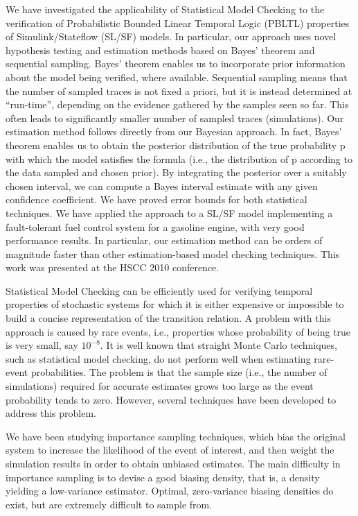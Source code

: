 We have investigated the applicability of Statistical Model Checking to the verification of Probabilistic Bounded Linear Temporal Logic (PBLTL) properties of Simulink/Stateflow (SL/SF) models. In particular, our approach uses novel hypothesis testing and estimation methods based on Bayes’ theorem and sequential sampling. Bayes’ theorem enables us to incorporate prior information about the model being verified, where available. Sequential sampling means that the number of sampled traces is not fixed a priori, but it is instead determined at “run-time”, depending on the evidence gathered by the samples seen so far. This often leads to significantly smaller number of sampled traces (simulations). Our estimation method follows directly from our Bayesian approach. In fact, Bayes’ theorem enables us to obtain the posterior distribution of the true probability p with which the model satisfies the formula (i.e., the distribution of p according to the data sampled and chosen prior). By integrating the posterior over a suitably chosen interval, we can compute a Bayes interval estimate with any given confidence coefficient. We have proved error bounds for both statistical techniques. We have applied the approach to a SL/SF model implementing a fault-tolerant fuel control system for a gasoline engine, with very good performance results. In particular, our estimation method can be orders of magnitude faster than other estimation-based model checking techniques. This work was presented at the HSCC 2010 conference.

Statistical Model Checking can be efficiently used for verifying temporal properties of stochastic systems for which it is either expensive or impossible to build a concise representation of the transition relation. A problem with this approach is caused by rare events, i.e., properties whose probability of being true is very small, say $10^{-8}$. It is well known that straight Monte Carlo techniques, such as statistical model checking, do not perform well when estimating rare-event probabilities. The problem is that the sample size (i.e., the number of simulations) required for accurate estimates grows too large as the event probability tends to zero. However, several techniques have been developed to address this problem.

We have been studying importance sampling techniques, which bias the original system to increase the likelihood of the event of interest, and then weight the simulation results in order to obtain unbiased estimates. The main difficulty in importance sampling is to devise a good biasing density, that is, a density yielding a low-variance estimator. Optimal, zero-variance biasing densities do exist, but are extremely difficult to sample from.

